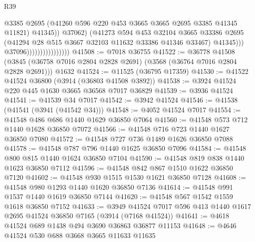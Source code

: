 \begin{lexlean}{R39}
\begin{coremodule}
                                              @3385
                                              @2695
                                              (@41260
                                                @596
                                                @220
                                                @453
                                                @3665
                                                @3665
                                                @2695
                                                @3385
                                                @41345
                                                @11821)
                                              @41345))
                                          @37062)
                                        (@41273
                                          @594
                                          @453
                                          @32104
                                          @3665
                                          @33386
                                          @2695
                                          (@41294 @28 @515 @3667 @32103 @11632 @33386 @41346 @33467)
                                          @41345)))
                                    @37096))))))))))))))))
@41508 := @7018 @36755
@41522 := @36778
    @41508
    (@3845 (@36758 @7016 @2804 @2828 @2691) (@3568 (@36764 @7016 @2804 @2828 @2691)))
    @1632
@41524 := @11525 (@36795 @17359)
@41530 := @41522 @41524 @36800 (@3914 (@36803 @41508 @3892))
@41538 := @3924 @41524 @220 @445 @1630 @3665 @36568 @7017 @36829
@41539 := @3936 @41524
@41541 := @41539 @34 @7017
@41542 := @3942 @41524
@41546 := @41538 (@41541 (@3941 (@41542 @34)))
@41548 := @4052 @41524 @7017
@41554 := @41548 @486 @686 @1440 @1629 @36850 @7064
@41560 := @41548 @573 @712 @1440 @1628 @36850 @7072
@41566 := @41548 @716 @723 @1440 @1627 @36850 @7080
@41572 := @41548 @727 @736 @1489 @1626 @36850 @7088
@41578 := @41548 @787 @796 @1440 @1625 @36850 @7096
@41584 := @41548 @800 @815 @1440 @1624 @36850 @7104
@41590 := @41548 @819 @838 @1440 @1623 @36850 @7112
@41596 := @41548 @842 @867 @1510 @1622 @36850 @7120
@41602 := @41548 @930 @1515 @1530 @1621 @36850 @7128
@41608 := @41548 @980 @1293 @1440 @1620 @36850 @7136
@41614 := @41548 @991 @1537 @1440 @1619 @36850 @7144
@41620 := @41548 @567 @1542 @1559 @1618 @36850 @7152
@41633 := @3949 @41524 @7017 @596 @413 @1440 @1617 @2695 @41524 @36850 @7165 (@3914 (@7168 @41524))
@41641 := @4618 @41524 @689 @1438 @494 @3690 @36863 @36877 @11153
@41648 := @4646 @41524 @530 @688 @3668 @3665 @11633 @11635

\end{coremodule}
\end{lexlean}
